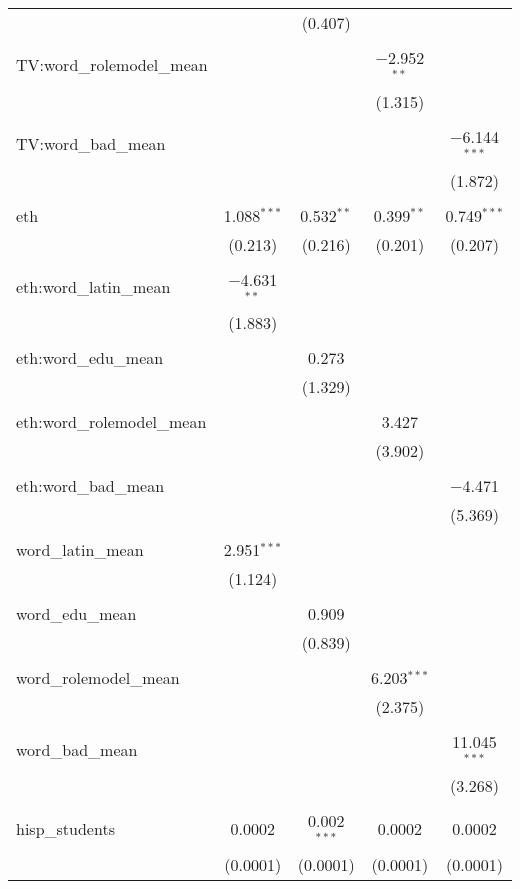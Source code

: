 \begin{table}[!htbp]
\begin{tabular}{@{\extracolsep{-2pt}}lcccc}
  &  & (0.407) &  &  \\ 
  & & & & \\ 
 TV:word\_rolemodel\_mean &  &  & $-$2.952$^{**}$ &  \\ 
  &  &  & (1.315) &  \\ 
  & & & & \\ 
 TV:word\_bad\_mean &  &  &  & $-$6.144$^{***}$ \\ 
  &  &  &  & (1.872) \\ 
  & & & & \\ 
 eth & 1.088$^{***}$ & 0.532$^{**}$ & 0.399$^{**}$ & 0.749$^{***}$ \\ 
  & (0.213) & (0.216) & (0.201) & (0.207) \\ 
  & & & & \\ 
 eth:word\_latin\_mean & $-$4.631$^{**}$ &  &  &  \\ 
  & (1.883) &  &  &  \\ 
  & & & & \\ 
 eth:word\_edu\_mean &  & 0.273 &  &  \\ 
  &  & (1.329) &  &  \\ 
  & & & & \\ 
 eth:word\_rolemodel\_mean &  &  & 3.427 &  \\ 
  &  &  & (3.902) &  \\ 
  & & & & \\ 
 eth:word\_bad\_mean &  &  &  & $-$4.471 \\ 
  &  &  &  & (5.369) \\ 
  & & & & \\ 
 word\_latin\_mean & 2.951$^{***}$ &  &  &  \\ 
  & (1.124) &  &  &  \\ 
  & & & & \\ 
 word\_edu\_mean &  & 0.909 &  &  \\ 
  &  & (0.839) &  &  \\ 
  & & & & \\ 
 word\_rolemodel\_mean &  &  & 6.203$^{***}$ &  \\ 
  &  &  & (2.375) &  \\ 
  & & & & \\ 
 word\_bad\_mean &  &  &  & 11.045$^{***}$ \\ 
  &  &  &  & (3.268) \\ 
  & & & & \\ 
 hisp\_students & 0.0002 & 0.002$^{***}$ & 0.0002 & 0.0002 \\ 
  & (0.0001) & (0.0001) & (0.0001) & (0.0001) \\ 

\end{tabular}
\end{table}
